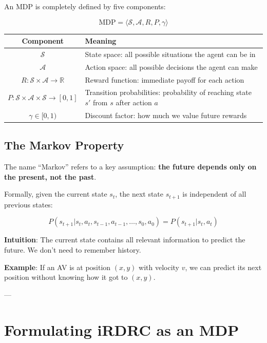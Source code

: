 \documentclass[12pt,a4paper]{article}
\begin{document}
An MDP is completely defined by five components:

\[
\boxed{\text{MDP} = \langle \mathcal{S}, \mathcal{A}, R, P, \gamma \rangle}
\]

\begin{table}[h]
\centering
\begin{tabular}{|c|l|}
\hline
\textbf{Component} & \textbf{Meaning} \\
\hline
$\mathcal{S}$ & State space: all possible situations the agent can be in \\
\hline
$\mathcal{A}$ & Action space: all possible decisions the agent can make \\
\hline
$R: \mathcal{S} \times \mathcal{A} \to \mathbb{R}$ & Reward function: immediate payoff for each action \\
\hline
$P: \mathcal{S} \times \mathcal{A} \times \mathcal{S} \to [0,1]$ & Transition probabilities: probability of reaching state $s'$ from $s$ after action $a$ \\
\hline
$\gamma \in [0,1)$ & Discount factor: how much we value future rewards \\
\hline
\end{tabular}
\end{table}

\subsection{The Markov Property}

The name ``Markov'' refers to a key assumption: \textbf{the future depends only on the present, not the past}.

Formally, given the current state $s_t$, the next state $s_{t+1}$ is independent of all previous states:

\[
P(s_{t+1} | s_t, a_t, s_{t-1}, a_{t-1}, \ldots, s_0, a_0) = P(s_{t+1} | s_t, a_t)
\]

\textbf{Intuition}: The current state contains all relevant information to predict the future. We don't need to remember history.

\textbf{Example}: If an AV is at position $(x, y)$ with velocity $v$, we can predict its next position without knowing how it got to $(x, y)$.

---

\section{Formulating iRDRC as an MDP}
\label{sec:irdrc_mdp}
\end{document}
